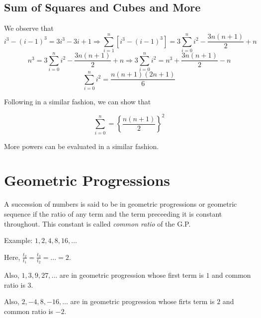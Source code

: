 \subsection{Sum of Squares and Cubes and More}
We observe that
$$i^3 - (i - 1)^3 = 3i^3 - 3i + 1 \Rightarrow \sum_{i = 1}^n[i^3 - (i - 1)^3] = 3\sum_{i = 0}^ni^2 - \frac{3n(n + 1)}{2} + n$$
$$n^3 = 3\sum_{i = 0}^ni^2 - \frac{3n(n + 1)}{2} + n \Rightarrow 3\sum_{i=0}^ni^2 = n^3 + \frac{3n(n + 1)}{2} - n$$
$$\sum_{i=0}^ni^2 = \frac{n(n + 1)(2n + 1)}{6}$$

Following in a similar fashion, we can show that

$$\sum_{i=0}^n = \left\{\frac{n(n + 1)}{2}\right\}^2$$

More powers can be evaluated in a similar fashion.

\section{Geometric Progressions}
A succession of numbers is said to be in geometric progressions or geometric sequence if the ratio of any term and the term
preceeding it is constant throughout. This constant is called \textit{common ratio} of the G.P.

Example: $1, 2, 4, 8, 16, \ldots$

Here, $\frac{t_2}{t_1} = \frac{t_3}{t_2} = \ldots = 2$.

Also, $1, 3, 9, 27,\ldots$ are in geometric progression whose first term is $1$ and common ratio is $3$.

Also, $2, -4, 8, -16, \ldots$ are in geometric progression whose firts term is $2$ and common ratio is $-2$.

